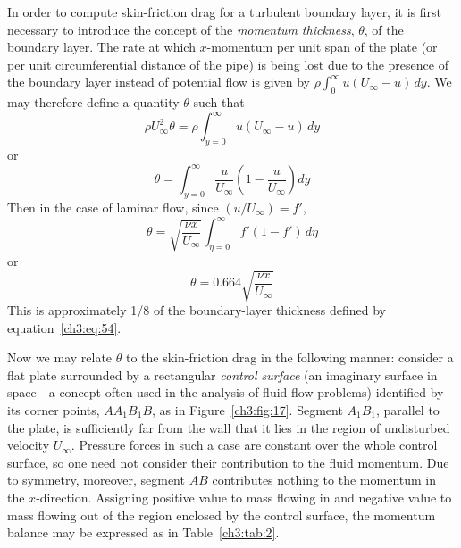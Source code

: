 In order to compute skin-friction drag for a turbulent
boundary layer, it is first necessary to introduce the concept
of the \emph{momentum thickness}, $\theta$, of the boundary layer. The rate
at which $x$-momentum per unit span of the plate (or per unit
circumferential distance of the pipe) is being lost due to
the presence of the boundary layer instead of potential flow
is given by $\rho\int_{0}^{\infty} u(U_\infty - u)\,dy$. We may therefore define a quantity
$\theta$ such that
\begin{equation}\label{ch3:eq:65}
\rho U_\infty^{2}\theta = \rho\int_{y=0}^{\infty} u(U_\infty - u)\,dy
\end{equation}
or
\begin{equation}\label{ch3:eq:66}
\theta = \int_{y=0}^{\infty} \frac{u}{U_\infty}\left(1 - \frac{u}{U_\infty}\right)dy
\end{equation}
Then in the case of laminar flow, since $(u/U_\infty) = f'$,
\begin{equation}\label{ch3:eq:67}
\theta = \sqrt{\frac{\nu x}{U_\infty}}\int_{\eta=0}^{\infty} f'(1 - f')\,d\eta
\end{equation}
or
\begin{equation}\label{ch3:eq:68}
\theta = 0.664\sqrt{\frac{\nu x}{U_\infty}}
\end{equation}
This is approximately 1/8 of the boundary-layer thickness
defined by equation~\eqref{ch3:eq:54}.

Now we may relate $\theta$ to the skin-friction drag in the
following manner: consider a flat plate surrounded by a rectangular
\emph{control surface} (an imaginary surface in space---a
concept often used in the analysis of fluid-flow problems)
identified by its corner points, $AA_1B_1B$, as in Figure~\ref{ch3:fig:17}.
Segment $A_1B_1$, parallel to the plate, is sufficiently far from
the wall that it lies in the region of undisturbed velocity $U_\infty$.
Pressure forces in such a case are constant over the whole control
surface, so one need not consider their contribution to the
fluid momentum. Due to symmetry, moreover, segment $AB$ contributes
nothing to the momentum in the $x$-direction. Assigning positive
value to mass flowing in and negative value to mass flowing
out of the region enclosed by the control surface, the momentum
balance may be expressed as in Table~\ref{ch3:tab:2}.


